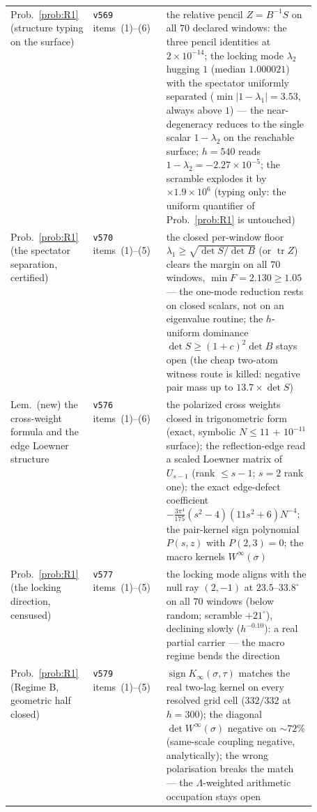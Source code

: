 \documentclass[11pt,a4paper]{article}
\theoremstyle{plain}
\theoremstyle{definition}
\begin{document}
{\begin{xltabular}{\textwidth}{@{}p{0.27\linewidth}p{0.24\linewidth}Y@{}}
Prob.~\ref{prob:R1} (structure typing on the surface)
  & \texttt{v569} items~(1)--(6)
  & the relative pencil $Z=B^{-1}S$ on all $70$ declared windows: the three
    pencil identities at $2\times10^{-14}$; the locking mode $\lambda_2$
    hugging $1$ (median $1.000021$) with the spectator uniformly separated
    ($\min|1-\lambda_1|=3.53$, always above $1$) --- the near-degeneracy
    reduces to the single scalar $1-\lambda_2$ on the reachable surface;
    $h=540$ reads $1-\lambda_2=-2.27\times10^{-5}$; the scramble explodes it
    by $\times1.9\times10^{6}$ (typing only: the uniform quantifier of
    Prob.~\ref{prob:R1} is untouched) \\
Prob.~\ref{prob:R1} (the spectator separation, certified)
  & \texttt{v570} items~(1)--(5)
  & the closed per-window floor $\lambda_1\ge\sqrt{\det S/\det B}$ (or
    $\operatorname{tr}Z$) clears the margin on all $70$ windows,
    $\min F=2.130\ge1.05$ --- the one-mode reduction rests on closed
    scalars, not on an eigenvalue routine; the $h$-uniform dominance
    $\det S\ge(1+c)^2\det B$ stays open (the cheap two-atom witness route
    is killed: negative pair mass up to $13.7\times\det S$) \\
Lem.~(new) the cross-weight formula and the edge Loewner structure
  & \texttt{v576} items~(1)--(6)
  & the polarized cross weights closed in trigonometric form (exact,
    symbolic $N\le11$ + $10^{-11}$ surface); the reflection-edge read a
    scaled Loewner matrix of $U_{s-1}$ (rank $\le s-1$; $s=2$ rank one);
    the exact edge-defect coefficient
    $-\tfrac{3\pi^4}{175}(s^2-4)(11s^2+6)N^{-4}$; the pair-kernel sign
    polynomial $P(s,z)$ with $P(2,3)=0$; the macro kernels
    $W^\infty(\sigma)$ \\
Prob.~\ref{prob:R1} (the locking direction, censused)
  & \texttt{v577} items~(1)--(5)
  & the locking mode aligns with the null ray $(2,-1)$ at
    $23.5$--$33.8^\circ$ on all $70$ windows (below random; scramble
    $+21^\circ$), declining slowly ($h^{-0.10}$): a real partial
    carrier --- the macro regime bends the direction \\
Prob.~\ref{prob:R1} (Regime B, geometric half closed)
  & \texttt{v579} items~(1)--(5)
  & $\operatorname{sign}K_\infty(\sigma,\tau)$ matches the real two-lag
    kernel on every resolved grid cell ($332/332$ at $h=300$); the
    diagonal $\det W^\infty(\sigma)$ negative on ${\sim}72\%$
    (same-scale coupling negative, analytically); the wrong polarisation
    breaks the match --- the $\Lambda$-weighted arithmetic occupation
    stays open \\

\end{xltabular}}
\end{document}
